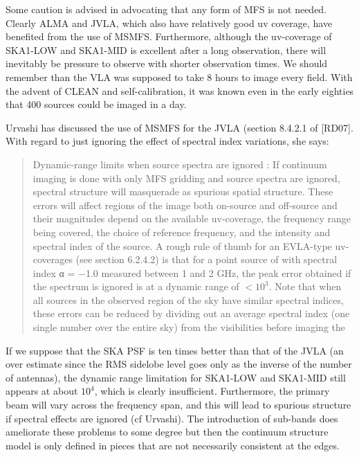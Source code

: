\documentclass[11pt,a4paper,variablewidth]{article}
\begin{document}
Some caution is advised in advocating that any form of MFS is not needed. Clearly ALMA and JVLA, which also have relatively good uv coverage, have benefited from the use of MSMFS. Furthermore, although the uv-coverage of SKA1-LOW and SKA1-MID is excellent after a long observation, there will inevitably be pressure to observe with shorter observation times. We should remember than the VLA was supposed to take 8 hours to image every field. With the advent of CLEAN and self-calibration, it was known even in the early eighties that 400 sources could be imaged in a day.

Urvashi has discussed the use of MSMFS for the JVLA (section 8.4.2.1 of [RD07]. With regard to just ignoring the effect of spectral index variations, she says:

\begin{quotation}

Dynamic-range limits when source spectra are ignored : If continuum imaging is done with only MFS gridding and source spectra are ignored, spectral structure will masquerade as spurious spatial structure. These errors will affect regions of the image both on-source and off-source and their magnitudes depend on the available uv-coverage, the frequency range being covered, the choice of reference frequency, and the intensity and spectral index of the source. A rough rule of thumb for an EVLA-type uv-coverages (see section 6.2.4.2) is that for a point source of with spectral index α = −1.0 measured between 1 and 2 GHz, the peak error obtained if the spectrum is ignored is at a dynamic range of $ < 10^3$. Note that when all sources in the observed region of the sky have similar spectral indices, these errors can be reduced by dividing out an average spectral index (one single number over the entire sky) from the visibilities before imaging the\end{quotation}

If we suppose that the SKA PSF is ten times better than that of the JVLA (an over estimate since the RMS sidelobe level goes only as the inverse of the number of antennas), the dynamic range limitation for SKA1-LOW and SKA1-MID still appears at about $10^4$, which is clearly insufficient. Furthermore, the primary beam will vary across the frequency span, and this will lead to spurious structure if spectral effects are ignored (cf Urvashi). The introduction of sub-bands does ameliorate these problems to some degree but then the continuum structure model is only defined in pieces that are not necessarily consistent at the edges.
\end{document}
